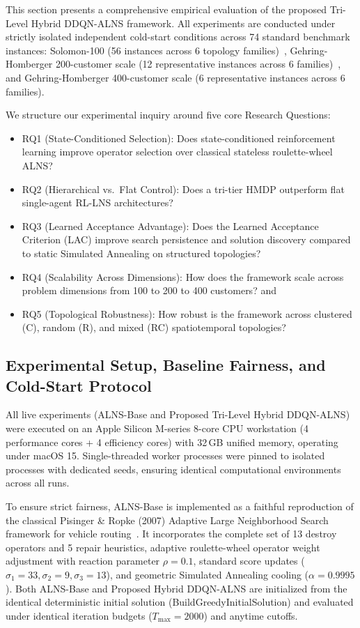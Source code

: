 \documentclass{ieeeaccess}
\begin{document}
This section presents a comprehensive empirical evaluation of the proposed Tri-Level Hybrid DDQN-ALNS framework. All experiments are conducted under strictly isolated independent cold-start conditions across 74 standard benchmark instances: Solomon-100 (56 instances across 6 topology families)~\cite{Solomon1987}, Gehring-Homberger 200-customer scale (12 representative instances across 6 families)~\cite{gehring1999parallel}, and Gehring-Homberger 400-customer scale (6 representative instances across 6 families).

We structure our experimental inquiry around five core Research Questions: \begin{itemize}
    \item RQ1 (State-Conditioned Selection): Does state-conditioned reinforcement learning improve operator selection over classical stateless roulette-wheel ALNS?
    \item RQ2 (Hierarchical vs.\ Flat Control): Does a tri-tier HMDP outperform flat single-agent RL-LNS architectures?
    \item RQ3 (Learned Acceptance Advantage): Does the Learned Acceptance Criterion (LAC) improve search persistence and solution discovery compared to static Simulated Annealing on structured topologies?
    \item RQ4 (Scalability Across Dimensions): How does the framework scale across problem dimensions from 100 to 200 to 400 customers? and
    \item RQ5 (Topological Robustness): How robust is the framework across clustered (C), random (R), and mixed (RC) spatiotemporal topologies?
\end{itemize}   

\subsection{Experimental Setup, Baseline Fairness, and Cold-Start Protocol}
\label{sec:exp_setup}

All live experiments (ALNS-Base and Proposed Tri-Level Hybrid DDQN-ALNS) were executed on an Apple Silicon M-series 8-core CPU workstation (4 performance cores + 4 efficiency cores) with 32\,GB unified memory, operating under macOS 15. Single-threaded worker processes were pinned to isolated processes with dedicated seeds, ensuring identical computational environments across all runs.

To ensure strict fairness, ALNS-Base is implemented as a faithful reproduction of the classical Pisinger \& Ropke (2007) Adaptive Large Neighborhood Search framework for vehicle routing~\cite{pisinger2007general}. It incorporates the complete set of 13 destroy operators and 5 repair heuristics, adaptive roulette-wheel operator weight adjustment with reaction parameter $\rho = 0.1$, standard score updates ($\sigma_1 = 33, \sigma_2 = 9, \sigma_3 = 13$), and geometric Simulated Annealing cooling ($\alpha = 0.9995$). Both ALNS-Base and Proposed Hybrid DDQN-ALNS are initialized from the identical deterministic initial solution (\textsf{\small BuildGreedyInitialSolution}) and evaluated under identical iteration budgets ($T_{\max} = 2000$) and anytime cutoffs.
\end{document}
